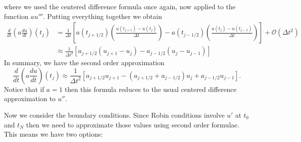 where we used the centered difference formula once again, now 
applied to the function $a u'''$. Putting everything together
we obtain
\begin{equation*}
    \begin{aligned}
    \frac{d}{dt} \left( a \frac{du}{dt}  \right)(t_j)
    &= \frac{1}{\Delta t}
    \left[ 
    a(t_{j+1/2})    
    \left( \frac{u(t_{j+1}) - u(t_j)}{\Delta t} \right)
    - 
    a(t_{j-1/2})    
    \left( \frac{u(t_{j}) - u(t_{j-1})}
    {\Delta t} \right)
    \right] 
    + \mathcal{O}(\Delta t^2) \\
     &\approx \frac{1}{\Delta t^2} 
     \left[ a_{j+1/2} (u_{j+1} - u_j) 
     - a_{j-1/2} ( u_j - u_{j-1})  \right]
    \end{aligned}
\end{equation*}
In summary, we have the second order approximation 
\begin{equation}\label{eq:l17:diffusion-op}
    \frac{d}{dt} \left( a \frac{du}{dt} \right) (t_j)
\approx    \frac{1}{\Delta t^2} 
     \left[ a_{j+1/2} u_{j+1} 
     - (a_{j+1/2} + a_{j-1/2}) u_j 
        + a_{j-1/2} u_{j-1}
     \right].
\end{equation}
Notice that if $a = 1$ then this formula reduces
to the usual centered difference approximation 
to $u''$. 

Now we consider the boundary conditions. Since Robin 
conditions involve $u'$ at $t_0$ and $t_N$
then we need to approximate those values 
using second order formulae. This means we have 
two options: 

